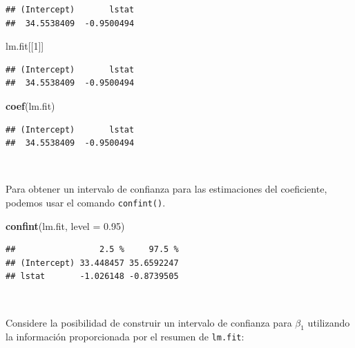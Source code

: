 \documentclass[]{book}
\newenvironment{Shaded}{\begin{snugshade}}{\end{snugshade}}
\newcommand{\KeywordTok}[1]{\textcolor[rgb]{0.13,0.29,0.53}{\textbf{#1}}}
\newcommand{\DataTypeTok}[1]{\textcolor[rgb]{0.13,0.29,0.53}{#1}}
\newcommand{\DecValTok}[1]{\textcolor[rgb]{0.00,0.00,0.81}{#1}}
\newcommand{\FloatTok}[1]{\textcolor[rgb]{0.00,0.00,0.81}{#1}}
\newcommand{\OperatorTok}[1]{\textcolor[rgb]{0.81,0.36,0.00}{\textbf{#1}}}
\newcommand{\NormalTok}[1]{#1}
\begin{document}
\begin{verbatim}
## (Intercept)       lstat 
##  34.5538409  -0.9500494
\end{verbatim}

\begin{Shaded}
\begin{Highlighting}[]
\NormalTok{lm.fit[[}\DecValTok{1}\NormalTok{]]}
\end{Highlighting}
\end{Shaded}

\begin{verbatim}
## (Intercept)       lstat 
##  34.5538409  -0.9500494
\end{verbatim}

\begin{Shaded}
\begin{Highlighting}[]
\KeywordTok{coef}\NormalTok{(lm.fit)}
\end{Highlighting}
\end{Shaded}

\begin{verbatim}
## (Intercept)       lstat 
##  34.5538409  -0.9500494
\end{verbatim}

~

Para obtener un intervalo de confianza para las estimaciones del
coeficiente, podemos usar el comando \texttt{confint()}.

\begin{Shaded}
\begin{Highlighting}[]
\KeywordTok{confint}\NormalTok{(lm.fit, }\DataTypeTok{level =} \FloatTok{0.95}\NormalTok{)}
\end{Highlighting}
\end{Shaded}

\begin{verbatim}
##                 2.5 %     97.5 %
## (Intercept) 33.448457 35.6592247
## lstat       -1.026148 -0.8739505
\end{verbatim}

~

Considere la posibilidad de construir un intervalo de confianza para
\(\beta_1\) utilizando la información proporcionada por el resumen de
\texttt{lm.fit}:

\begin{Shaded}
\end{Shaded}
\end{document}
